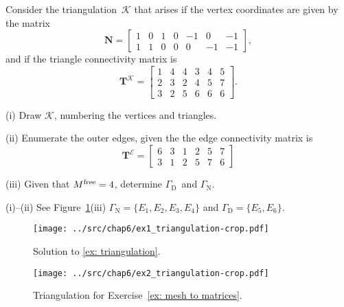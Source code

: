\begin{Exercises}
\exercise\label{ex: triangulation}
Consider the triangulation~$\mathcal{K}$ that arises if the vertex coordinates 
are given by the matrix
\[
\boldsymbol{N}=\begin{bmatrix}
1&0&1&0&-1& 0&-1\\
1&1&0&0& 0&-1&-1\end{bmatrix},
\]
and if the triangle connectivity matrix is
\[
\boldsymbol{T}^{\mathcal{K}}=\begin{bmatrix}
1&4&4&3&4&5\\
2&3&2&4&5&7\\
3&2&5&6&6&6\end{bmatrix}.
\]
\begin{description}
\item{(i)} Draw $\mathcal{K}$, numbering the vertices and triangles.
\item{(ii)} Enumerate the outer edges, given the the edge connectivity matrix is
\[
\boldsymbol{T}^{\mathcal{E}}=\begin{bmatrix}
6&3&1&2&5&7\\
3&1&2&5&7&6\end{bmatrix}
\]
\item{(iii)} Given that $M^{\mathrm{free}}=4$, determine $\Gamma_{\mathrm{D}}$~and
$\Gamma_{\mathrm{N}}$.
\end{description}
\begin{ans}
(i)--(ii) See Figure~\ref{fig: triangulation solution}\quad(iii) 
$\Gamma_{\mathrm{N}}=\{E_1,E_2,E_3,E_4\}$ and
$\Gamma_{\mathrm{D}}=\{E_5,E_6\}$.
\begin{figure}
\caption{Solution to \ref{ex: triangulation}.}
\label{fig: triangulation solution}
\begin{center}
\texttt{[image: ../src/chap6/ex1\_triangulation-crop.pdf]}
\end{center}
\end{figure}
\end{ans}

\begin{figure}
\caption{Triangulation for Exercise~\ref{ex: mesh to matrices}.}
\label{fig: mesh to matrices}
\begin{center}
\texttt{[image: ../src/chap6/ex2\_triangulation-crop.pdf]}
\end{center}
\end{figure}


\end{Exercises}
